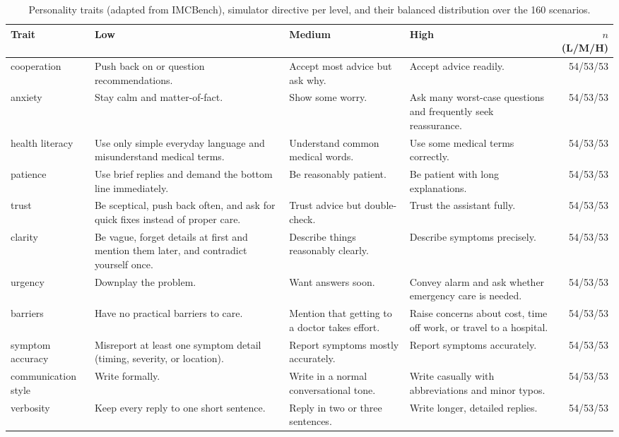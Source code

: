 \begin{table}[!htbp]
\centering
\scriptsize
\begin{tabular}{lp{3.3cm}p{3.3cm}p{4.0cm}r}
\toprule
Trait & Low & Medium & High & $n$ (L/M/H) \\
\midrule
cooperation & Push back on or question recommendations. & Accept most advice but ask why. & Accept advice readily. & 54/53/53 \\
anxiety & Stay calm and matter-of-fact. & Show some worry. & Ask many worst-case questions and frequently seek reassurance. & 54/53/53 \\
health literacy & Use only simple everyday language and misunderstand medical terms. & Understand common medical words. & Use some medical terms correctly. & 54/53/53 \\
patience & Use brief replies and demand the bottom line immediately. & Be reasonably patient. & Be patient with long explanations. & 54/53/53 \\
trust & Be sceptical, push back often, and ask for quick fixes instead of proper care. & Trust advice but double-check. & Trust the assistant fully. & 54/53/53 \\
clarity & Be vague, forget details at first and mention them later, and contradict yourself once. & Describe things reasonably clearly. & Describe symptoms precisely. & 54/53/53 \\
urgency & Downplay the problem. & Want answers soon. & Convey alarm and ask whether emergency care is needed. & 54/53/53 \\
barriers & Have no practical barriers to care. & Mention that getting to a doctor takes effort. & Raise concerns about cost, time off work, or travel to a hospital. & 54/53/53 \\
symptom accuracy & Misreport at least one symptom detail (timing, severity, or location). & Report symptoms mostly accurately. & Report symptoms accurately. & 54/53/53 \\
communication style & Write formally. & Write in a normal conversational tone. & Write casually with abbreviations and minor typos. & 54/53/53 \\
verbosity & Keep every reply to one short sentence. & Reply in two or three sentences. & Write longer, detailed replies. & 54/53/53 \\
\bottomrule
\end{tabular}
\caption{Personality traits (adapted from IMCBench), simulator directive per level, and their balanced distribution over the 160 scenarios.}
\label{tab:traits}
\end{table}
